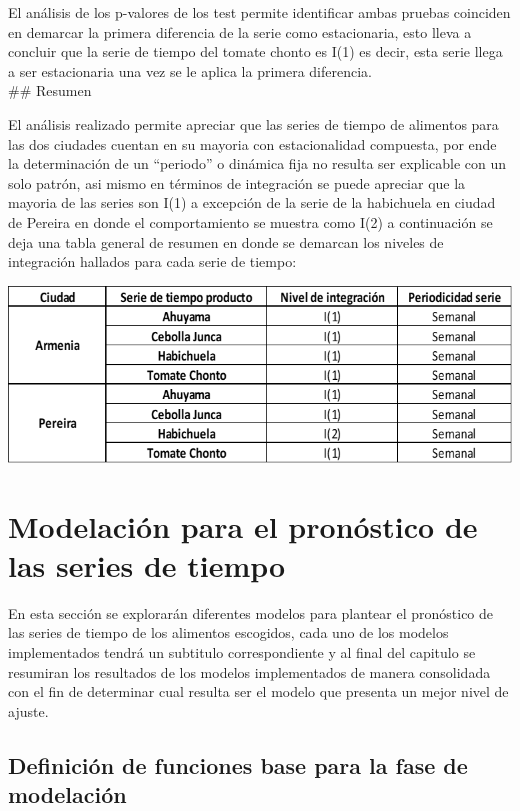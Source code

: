 \documentclass[
]{book}
\begin{document}
El análisis de los p-valores de los test permite identificar ambas pruebas coinciden en demarcar la primera diferencia de la serie como estacionaria, esto lleva a concluir que la serie de tiempo del tomate chonto es I(1) es decir, esta serie llega a ser estacionaria una vez se le aplica la primera diferencia.\\
\#\# Resumen

El análisis realizado permite apreciar que las series de tiempo de alimentos para las dos ciudades cuentan en su mayoria con estacionalidad compuesta, por ende la determinación de un ``periodo'' o dinámica fija no resulta ser explicable con un solo patrón, asi mismo en términos de integración se puede apreciar que la mayoria de las series son I(1) a excepción de la serie de la habichuela en ciudad de Pereira en donde el comportamiento se muestra como I(2) a continuación se deja una tabla general de resumen en donde se demarcan los niveles de integración hallados para cada serie de tiempo:

\includegraphics{NivelIntegracion.png}

\hypertarget{modelaciuxf3n-para-el-pronuxf3stico-de-las-series-de-tiempo}{%
\chapter{Modelación para el pronóstico de las series de tiempo}\label{modelaciuxf3n-para-el-pronuxf3stico-de-las-series-de-tiempo}}

En esta sección se explorarán diferentes modelos para plantear el pronóstico de las series de tiempo de los alimentos escogidos, cada uno de los modelos implementados tendrá un subtitulo correspondiente y al final del capitulo se resumiran los resultados de los modelos implementados de manera consolidada con el fin de determinar cual resulta ser el modelo que presenta un mejor nivel de ajuste.

\hypertarget{definiciuxf3n-de-funciones-base-para-la-fase-de-modelaciuxf3n}{%
\section{Definición de funciones base para la fase de modelación}\label{definiciuxf3n-de-funciones-base-para-la-fase-de-modelaciuxf3n}}
\end{document}
